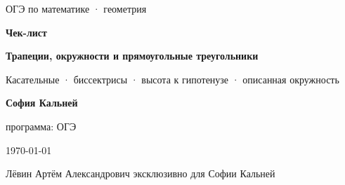 \documentclass[a4paper,12pt]{article}
\begin{document}

\thispagestyle{empty}

\begin{center}

\vspace*{23mm}

{\small\textcolor{softgray}{ОГЭ по математике · геометрия}}\par

\vspace{10mm}

{\Huge\bfseries\color{darkaccent}Чек-лист}\par

\vspace{4mm}

{\Large\bfseries
Трапеции, окружности и прямоугольные треугольники
}\par

\vspace{5mm}

{\large
Касательные · биссектрисы · высота к гипотенузе · описанная окружность
}\par

\vspace{18mm}

{\large\bfseries София Кальней}\par

{\normalsize программа: ОГЭ}\par

\vfill

{\normalsize \today}\par

\vspace{4mm}

{\small
Лёвин Артём Александрович эксклюзивно для Софии Кальней
}\par

\vspace{15mm}


\end{center}

\clearpage
\end{document}
